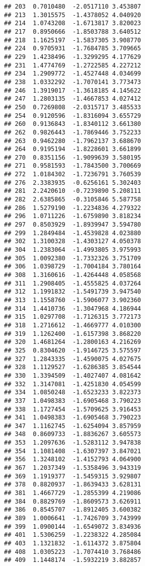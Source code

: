 \documentclass[
]{article}
\begin{document}
\begin{verbatim}
## 203  0.7010480  -2.0517110 3.453807
## 213  1.3015575  -1.4378052 4.040920
## 214  1.0743208  -1.6713817 3.820023
## 217  0.8950666  -1.8503788 3.640512
## 218  1.1625197  -1.5837305 3.908770
## 224  0.9705931  -1.7684785 3.709665
## 229  1.4238496  -1.3299295 4.177629
## 231  1.4774769  -1.2722585 4.227212
## 234  1.2909772  -1.4527448 4.034699
## 238  1.0332292  -1.7070141 3.773473
## 246  1.3919017  -1.3618185 4.145622
## 247  1.2803135  -1.4667853 4.027412
## 250  0.7269808  -2.0315717 3.485533
## 254  0.9120596  -1.8316094 3.655729
## 260  0.9136843  -1.8340112 3.661380
## 262  0.9826443  -1.7869446 3.752233
## 263  0.9462280  -1.7962137 3.688670
## 264  0.9195194  -1.8228601 3.661899
## 270  0.8351156  -1.9099639 3.580195
## 271  0.9581593  -1.7843500 3.700669
## 272  1.0184302  -1.7236791 3.760539
## 276  2.3383935  -0.6256161 5.302403
## 281  2.2420610  -0.7239890 5.208111
## 282  2.6385865  -0.3105846 5.587758
## 286  1.5279190  -1.2234836 4.279322
## 296  1.0711226  -1.6759890 3.818234
## 297  0.8503929  -1.8939947 3.594780
## 299  1.2849484  -1.4539828 4.023880
## 302  1.3100328  -1.4303127 4.050378
## 304  1.2383064  -1.4993805 3.975993
## 305  1.0092380  -1.7332326 3.751709
## 306  1.0398729  -1.7004184 3.780164
## 308  1.3160616  -1.4264448 4.058568
## 311  1.2908405  -1.4555825 4.037264
## 312  1.1991832  -1.5491739 3.947540
## 313  1.1558760  -1.5906077 3.902360
## 314  1.4410736  -1.3047968 4.186944
## 315  1.0297708  -1.7126315 3.772173
## 318  1.2716612  -1.4669777 4.010300
## 319  1.1262400  -1.6157398 3.868220
## 320  1.4681264  -1.2800163 4.216269
## 325  0.8304620  -1.9146725 3.575597
## 327  1.2843335  -1.4590075 4.027675
## 328  1.1129527  -1.6286385 3.854544
## 330  1.3394509  -1.4027407 4.081642
## 332  1.3147081  -1.4251830 4.054599
## 334  1.0850248  -1.6523233 3.822373
## 337  1.0498383  -1.6905468 3.790223
## 338  1.1727454  -1.5709625 3.916453
## 341  1.0498383  -1.6905468 3.790223
## 347  1.1162745  -1.6254094 3.857959
## 348  0.8609733  -1.8836267 3.605573
## 353  1.2097636  -1.5283112 3.947838
## 354  1.1081408  -1.6307397 3.847021
## 356  1.3248102  -1.4152793 4.064900
## 367  1.2037349  -1.5358496 3.943319
## 369  1.1919377  -1.5459315 3.929807
## 378  0.8820937  -1.8639433 3.628131
## 381  1.4667729  -1.2855399 4.219086
## 384  0.8829769  -1.8609573 3.626911
## 386  0.8545707  -1.8912405 3.600382
## 389  1.0006641  -1.7426709 3.743999
## 399  1.0900144  -1.6549072 3.834936
## 401  1.5306259  -1.2238322 4.285084
## 403  1.1321832  -1.6114372 3.875804
## 408  1.0305223  -1.7074410 3.768486
## 409  1.1448174  -1.5932219 3.882857

\end{verbatim}
\end{document}
